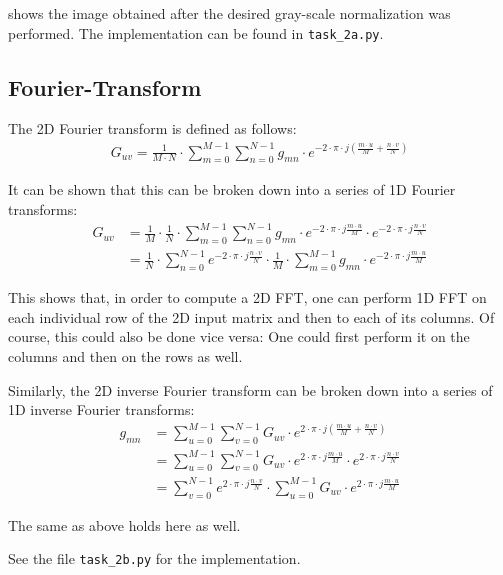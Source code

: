 \documentclass[a4paper,twocolumn]{article}
\begin{document}
	 shows the image obtained after the desired gray-scale normalization was performed. The implementation can be found in \texttt{task\_2a.py}.
	
	\subsection{Fourier-Transform}
	
	The 2D Fourier transform is defined as follows:
	\begin{align*}
	G_{uv} = \frac{1}{M \cdot N} \cdot
	\sum_{m=0}^{M-1} \sum_{n=0}^{N-1} g_{mn} \cdot
	e^{-2 \cdot  \pi \cdot j (\frac{m \cdot u}{M} + \frac{n \cdot v}{N})}
	\end{align*}
	
	It can be shown that this can be broken down into a series of 1D Fourier transforms:
	\begin{align*}
	G_{uv}
	&= \frac{1}{M} \cdot \frac{1}{N} \cdot
	\sum_{m=0}^{M-1} \sum_{n=0}^{N-1} g_{mn} \cdot
	e^{-2 \cdot  \pi \cdot j \frac{m \cdot u}{M}} \cdot
	e^{-2 \cdot  \pi \cdot j \frac{n \cdot v}{N}} \\
	&= \frac{1}{N} \cdot \sum_{n=0}^{N-1}
	e^{-2 \cdot  \pi \cdot j \frac{n \cdot v}{N}} \cdot
	\frac{1}{M} \cdot \sum_{m=0}^{M-1}
	g_{mn} \cdot
	e^{-2 \cdot  \pi \cdot j \frac{m \cdot u}{M}}
	\end{align*}
	
	This shows that, in order to compute a 2D FFT, one can perform 1D FFT on each individual row of the 2D input matrix and then to each of its columns. Of course, this could also be done vice versa: One could first perform it on the columns and then on the rows as well.
	
	Similarly, the 2D inverse Fourier transform can be broken down into a series of 1D inverse Fourier transforms:
	\begin{align*}
	g_{mn}
	&= \sum_{u=0}^{M-1} \sum_{v=0}^{N-1} G_{uv} \cdot
	e^{2 \cdot  \pi \cdot j (\frac{m \cdot u}{M} + \frac{n \cdot v}{N})} \\
	&= \sum_{u=0}^{M-1} \sum_{v=0}^{N-1} G_{uv} \cdot
	e^{2 \cdot  \pi \cdot j \frac{m \cdot u}{M}} \cdot
	e^{2 \cdot  \pi \cdot j \frac{n \cdot v}{N}} \\
	&= \sum_{v=0}^{N-1} e^{2 \cdot \pi \cdot j \frac{n \cdot v}{N}} \cdot
	\sum_{u=0}^{M-1} G_{uv} \cdot
	e^{2 \cdot  \pi \cdot j \frac{m \cdot u}{M}}
	\end{align*}
	
	The same as above holds here as well.
	
	See the file \texttt{task\_2b.py} for the implementation.
	
\end{document}
